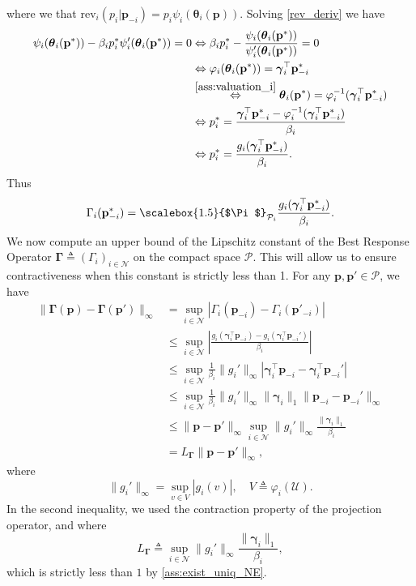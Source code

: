 \documentclass{article} %
\begin{document}
where we that $\mathrm{rev}_i(p_i | \mathbf{p}_{-i}) = p_i \psi_i(\boldsymbol{\theta}_i(\mathbf{p}))$. Solving \cref{rev_deriv} we have 
$$
\begin{aligned}
\psi_i(\boldsymbol{\theta}_i(\mathbf{p}^*))-\beta_ip_i^*\psi^\prime_i(\boldsymbol{\theta}_i(\mathbf{p}^*))=0 &\Leftrightarrow \beta_ip_i^* - \frac{\psi_i(\boldsymbol{\theta}_i(\mathbf{p}^*))}{\psi^\prime_i(\boldsymbol{\theta}_i(\mathbf{p}^*))}=0 \\
&\Leftrightarrow \varphi_i(\boldsymbol{\theta}_i(\mathbf{p}^*))=\boldsymbol{\gamma}_i^{\top} \mathbf{p}^*_{-i}\\
& \overset{\cref{ass:valuation_i}}{\Leftrightarrow} \boldsymbol{\theta}_i(\mathbf{p}^*)=\varphi_i^{-1}(\boldsymbol{\gamma}_i^{\top} \mathbf{p}^*_{-i})\\
&\Leftrightarrow p^*_i = \frac{\boldsymbol{\gamma}_i^{\top} \mathbf{p}^*_{-i}-\varphi_i^{-1}(\boldsymbol{\gamma}_i^{\top} \mathbf{p}^*_{-i})}{\beta_i}\\
&\Leftrightarrow p^*_i = \frac{g_i(\boldsymbol{\gamma}_i^{\top} \mathbf{p}^*_{-i})}{\beta_i}.
\end{aligned}
$$
Thus
\begin{align}\label{eq:close_form_opt_price}
\Gamma_i(\mathbf{p}^*_{-i}) =  \scalebox{1.5}{$\Pi$}_{\mathcal{P}_i}\frac{g_i(\boldsymbol{\gamma}_i^{\top} \mathbf{p}^*_{-i})}{\beta_i}.
\end{align}
We now compute an upper bound of the Lipschitz constant of the Best Response Operator $\boldsymbol{\Gamma}\triangleq \left(\Gamma_i\right)_{i \in \mathcal{N}}$ on the compact space $\mathcal{P}$. This will allow us to ensure contractiveness when this constant is strictly less than 1. For any $\mathbf{p},\mathbf{p}' \in \mathcal{P}$, we have 
$$
\begin{aligned}
\|\boldsymbol{\Gamma}\left(\mathbf{p}\right)-\boldsymbol{\Gamma}(\mathbf{p}')\|_{\infty} &= \sup_{i \in \mathcal{N}}|\Gamma_i(\mathbf{p}_{-i})-\Gamma_i(\mathbf{p}'_{-i})| \\
&\leq \sup_{i \in \mathcal{N}}\left|\frac{g_i(\boldsymbol{\gamma}_i^{\top} \mathbf{p}_{-i})-g_i(\boldsymbol{\gamma}_i^{\top} \mathbf{p}_{-i}')}{\beta_i}\right| \\
&\leq \sup_{i \in \mathcal{N}}\frac{1}{\beta_i}\|g_i'\|_{\infty}\left| \boldsymbol{\gamma}_i^{\top} \mathbf{p}_{-i}-\boldsymbol{\gamma}_i^{\top} \mathbf{p}_{-i}'\right|\\
&\leq \sup_{i \in \mathcal{N}}\frac{1}{\beta_i}\|g_i'\|_{\infty}\|\boldsymbol{\gamma}_i\|_1\|\mathbf{p}_{-i}-\mathbf{p}_{-i}'\|_{\infty} \\
&\leq\|\mathbf{p}-\mathbf{p}'\|_{\infty}\sup_{i \in \mathcal{N}}\|g_i'\|_{\infty}\frac{\|\boldsymbol{\gamma}_i\|_1}{\beta_i}\\
&= L_{\boldsymbol{\Gamma}}\|\mathbf{p}-\mathbf{p}'\|_{\infty},
\end{aligned}
$$
where
$$
\|g_i'\|_{\infty} = \sup_{v\in V}|g_i(v)|, \quad V \triangleq \varphi_i(\mathcal{U}).
$$
In the second inequality, we used the contraction property of the projection operator, and where
$$
  L_{\boldsymbol{\Gamma}} \triangleq \sup_{i \in \mathcal{N}}\|g_i'\|_{\infty}\frac{\|\boldsymbol{\gamma}_i\|_1}{\beta_i},
$$
which is strictly less than $1$ by \cref{ass:exist_uniq_NE}.
\end{document}
